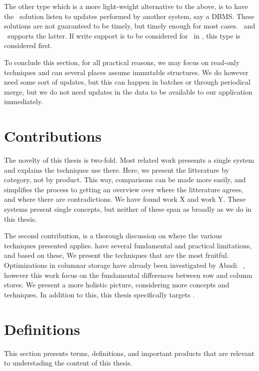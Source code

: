 The other type which is a more light-weight alternative to the above, is to have the \bd~solution listen to updates performed by another system, say a DBMS. These solutions are not guaranteed to be timely, but timely enough for most cases. \qlikview~and \tableau~supports the latter. If write support is to be considered for \bd~in \genusSoftware, this type is considered first.

To conclude this section, for all practical reasons, we may focus on read-only techniques and can several places assume immutable structures. We do however need some sort of updates, but this can happen in batches or through periodical merge, but we do not need updates in the data to be available to our application immediately. 



\section{Contributions}
\label{sec:Contributions}
The novelty of this thesis is two-fold. Most related work presesnts a single system and explains the techniques use there. Here, we present the litterature by category, not by product. This way, comparisons can be made more easily, and simplifies the process to getting an overview over where the litterature agrees, and where there are contradictions. We have found work X and work Y. These systems present single concepts, but neither of these span as broadly as we do in this thesis.

The second contribution, is a thorough discussion on where the various techniques presented applies. \genusSoftware have several fundamental and practical limitations, and based on these, We present the techniques that are the most fruitful. Optimizations in columnar storage have already been investigated by Abadi \ea~\cite{Abadi2008-dd}, however this work focus on the fundamental differences between row and column stores. We present a more holistic picture, considering more concepts and techniques. In addition to this, this thesis specifically targets \genusSoftware.

\section{Definitions}
\label{sec:Definitions}
This section presents terms, definitions, and important products that are relevant to understading the content of this thesis.

